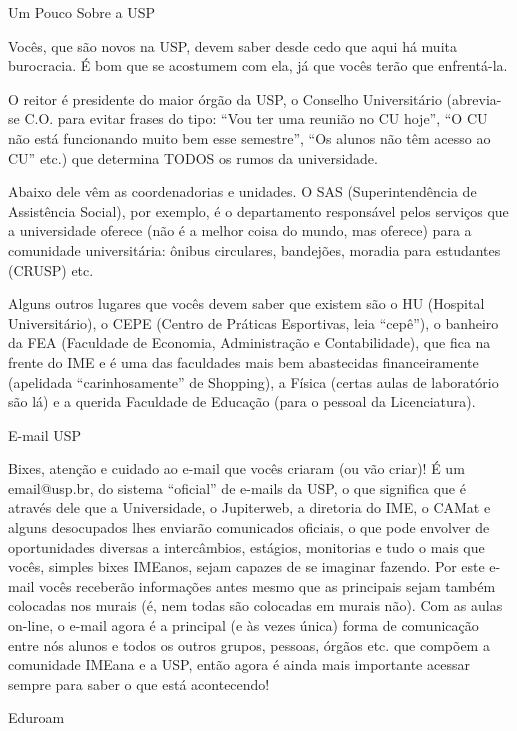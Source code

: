 \begin{secao}{Um Pouco Sobre a USP}

Vocês, que são novos na USP, devem saber desde cedo que aqui há muita
burocracia. É bom que se acostumem com ela, já que vocês terão que enfrentá-la.

O reitor é presidente do maior órgão da USP, o Conselho Universitário (abrevia-se
C.O. para evitar frases do tipo: ``Vou ter uma reunião no CU hoje'', ``O CU não
está funcionando muito bem esse semestre'', ``Os alunos não têm acesso ao CU''
etc.) que determina TODOS os rumos da universidade.

Abaixo dele vêm as coordenadorias e unidades. O SAS (Superintendência de Assistência Social),
por exemplo, é o departamento responsável pelos serviços
que a universidade oferece (não é a melhor coisa do mundo, mas oferece) para a
comunidade universitária: ônibus circulares, bandejões, moradia para estudantes
(CRUSP) etc.

Alguns outros lugares que vocês devem saber que existem são o HU (Hospital
Universitário), o CEPE (Centro de Práticas Esportivas, leia “cepê”), o banheiro
da FEA (Faculdade de Economia, Administração e Contabilidade), que fica na
frente do IME e é uma das faculdades mais bem abastecidas financeiramente
(apelidada “carinhosamente” de Shopping), a Física (certas aulas de laboratório são lá)
 e a querida Faculdade de Educação (para o pessoal da Licenciatura).

\begin{subsecao}{E-mail USP}

Bixes, atenção e cuidado ao e-mail que vocês criaram (ou vão criar)! É um
email@usp.br, do sistema “oficial” de e-mails da USP, o que significa que é
através dele que a Universidade, o Jupiterweb, a diretoria do IME, o CAMat e
alguns desocupados lhes enviarão comunicados oficiais, o que pode envolver de
oportunidades diversas a intercâmbios, estágios, monitorias e tudo o mais que
vocês, simples bixes IMEanos, sejam capazes de se imaginar fazendo. Por este e-mail
vocês receberão informações antes mesmo que as principais sejam também colocadas
nos murais (é, nem todas são colocadas em murais não). Com as aulas on-line, o          %
e-mail agora é a principal (e às vezes única) forma de comunicação entre nós
alunos e todos os outros grupos, pessoas, órgãos etc. que compõem a comunidade
IMEana e a USP, então agora é ainda mais importante acessar sempre para saber
o que está acontecendo!

\end{subsecao}
\begin{subsecao}{Eduroam}


\end{subsecao}
\end{secao}
